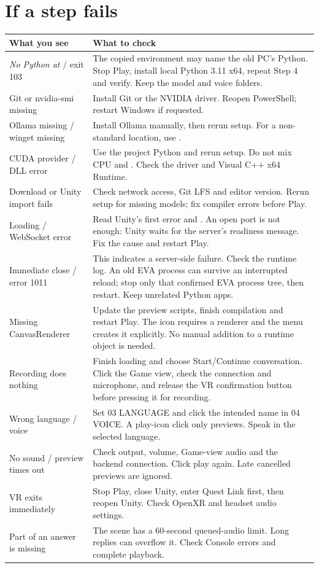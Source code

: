 \clearpage
\section*{If a step fails}
\begingroup\footnotesize
\begin{longtable}{@{}P{42mm}P{104mm}@{}}
\toprule
What you see & What to check\\
\midrule
\endhead
\textit{No Python at} / exit 103 & The copied environment may name the old PC's
Python. Stop Play, install local Python 3.11 x64, repeat Step 4 and verify.
Keep the model and voice folders.\\
Git or nvidia-smi missing & Install Git or the NVIDIA driver. Reopen PowerShell;
restart Windows if requested.\\
Ollama missing / winget missing & Install Ollama manually, then rerun setup.
For a non-standard location, use .\\
CUDA provider / DLL error & Use the project Python and rerun setup.
Do not mix CPU  and . Check the driver
and Visual C++ x64 Runtime.\\
Download or Unity import fails & Check network access, Git LFS and editor
version. Rerun setup for missing models; fix compiler errors before Play.\\
Loading / WebSocket error & Read Unity's first error and
. An open port is not enough: Unity waits
for the server's readiness message. Fix the cause and restart Play.\\
Immediate close / error 1011 & This indicates a server-side failure. Check the
runtime log. An old EVA process can survive an interrupted reload; stop only
that confirmed EVA process tree, then restart. Keep unrelated Python apps.\\
Missing CanvasRenderer & Update the preview scripts, finish compilation and
restart Play. The icon requires a renderer and the menu creates it explicitly.
No manual addition to a runtime object is needed.\\
Recording does nothing & Finish loading and choose Start/Continue conversation.
Click the Game view, check the connection and microphone, and release the VR
confirmation button before pressing it for recording.\\
Wrong language / voice & Set 03 LANGUAGE and click the intended name in
04 VOICE. A play-icon click only previews. Speak in the selected language.\\
No sound / preview times out & Check output, volume, Game-view audio and the
backend connection. Click play again. Late cancelled previews are ignored.\\
VR exits immediately & Stop Play, close Unity, enter Quest Link first, then
reopen Unity. Check OpenXR and headset audio settings.\\
Part of an answer is missing & The scene has a 60-second queued-audio limit.
Long replies can overflow it. Check Console errors and complete playback.\\
\bottomrule
\end{longtable}
\endgroup

